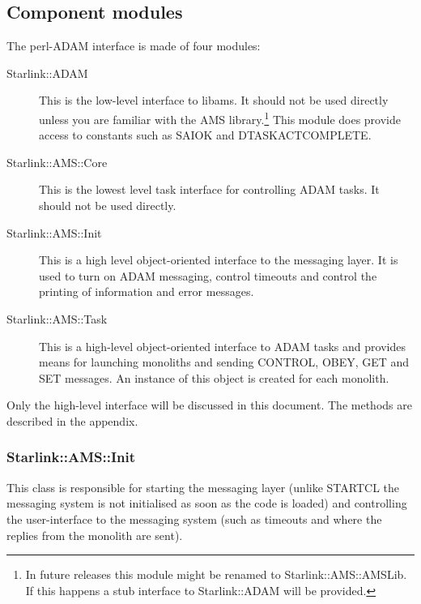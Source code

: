 \documentclass[twoside,11pt]{article}
\newcommand{\xref}[3]{#1}
\renewcommand{\_}{\texttt{\symbol{95}}}
\begin{document}
\subsection{Component modules}

The perl-ADAM interface is made of four modules:

\begin{description}
\item[Starlink::ADAM] 

This is the low-level interface to libams. It should not be used directly
unless you are familiar with the AMS library.\footnote{In future releases this 
module might be renamed to Starlink::AMS::AMSLib. If this happens a stub
interface to Starlink::ADAM will be provided.} This module does provide
access to constants such as SAI\_\_OK and DTASK\_\_ACTCOMPLETE.

\item[Starlink::AMS::Core]

This is the lowest level task interface for controlling ADAM tasks. It should
not be used directly.

\item[Starlink::AMS::Init]

This is a high level object-oriented interface to the messaging layer. It is
used to turn on ADAM messaging, control timeouts and control the printing
of information and error messages.

\item[Starlink::AMS::Task]

This is a high-level object-oriented interface to ADAM tasks and provides
means for launching monoliths and sending CONTROL, OBEY, GET and SET
messages. An instance of this object is created for each monolith.

\end{description}

Only the high-level interface will  be discussed in this document.
The methods are described in the appendix.

\subsubsection{Starlink::AMS::Init}


This class is responsible for starting the messaging layer (unlike
\xref{STARTCL}{sun186}{} the messaging system is not initialised as soon as
the code is loaded) and controlling the user-interface to the messaging system
(such as timeouts and where the replies from the monolith are sent).
\end{document}
